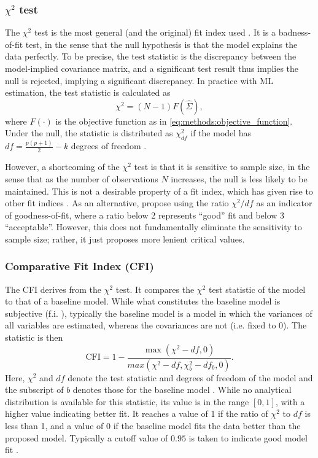 \subsubsection{$\chi^2$ test}
The $\chi^2$ test is the most general (and the original) fit index used \cite{smith2001primer}. It is a badness-of-fit
test, in the sense that the null hypothesis is that the model explains the data perfectly. To be precise,
the test statistic is the discrepancy between the model-implied covariance matrix, and a significant test result
thus implies the null is rejected, implying a significant discrepancy.
In practice with ML estimation, the test statistic is calculated as
\begin{equation}
    \label{eq:methods:chi2_test_stat}
    \chi^2 = (N - 1) F(\hat{\Sigma}),
\end{equation}
where $F(\cdot)$ is the objective function as in \cref{eq:methods:objective_function}.
Under the null, the statistic is distributed as $\chi^2_{df}$ if the model has $df = \frac{p(p + 1)}{2} - k$ degrees of freedom
\cite{zheng2025enhancing}.

However, a shortcoming of the $\chi^2$ test is that it is sensitive to sample size, in the sense that as
the number of observations $N$ increases, the null is less likely to be maintained. This is not a
desirable property of a fit index, which has given rise to other fit indices \cite{smith2001primer}.
As an alternative,  propose using the ratio $\chi^2 / df$ as an indicator of goodness-of-fit,
where a ratio below 2 represents ``good'' fit and below 3 ``acceptable''. However, this does not fundamentally eliminate
the sensitivity to sample size; rather, it just proposes more lenient critical values.

\subsubsection{Comparative Fit Index (CFI)}
The CFI derives from the $\chi^2$ test. It compares the $\chi^2$ test statistic of the model to that of a baseline model.
While what constitutes the baseline model is subjective (f.i. ), typically the baseline model is a
model in which the variances of all variables are estimated, whereas the covariances are not (i.e. fixed to 0).
The statistic is then
\begin{equation}
    \text{CFI} = 1 - \frac{\max(\chi^2 - df, 0)}{max(\chi^2 - df, \chi^2_b - df_b, 0)}.
\end{equation}
Here, $\chi^2$ and $df$ denote the test statistic and degrees of freedom of the model and the subscript of $b$ denotes
those for the baseline model \cite{schermelleh2003evaluating}.
While no analytical distribution is available for this statistic, its value is in the range $[0, 1]$, with a
higher value indicating better fit. It reaches a value of 1 if the ratio of $\chi^2$ to $df$ is less than 1,
and a value of 0 if the baseline model fits the data better than the proposed model.
Typically a cutoff value of $0.95$ is taken to indicate good model fit \cite{hu1999cutoff}.


